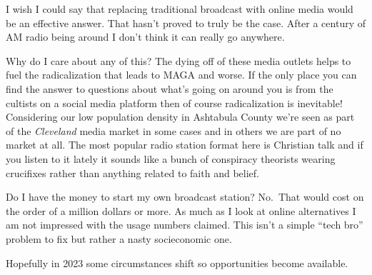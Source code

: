 I wish I could say that replacing traditional broadcast with online
media would be an effective answer. That hasn't proved to truly be the
case. After a century of AM radio being around I don't think it can
really go anywhere.

Why do I care about any of this? The dying off of these media outlets
helps to fuel the radicalization that leads to MAGA and worse. If the
only place you can find the answer to questions about what's going on
around you is from the cultists on a social media platform then of
course radicalization is inevitable! Considering our low population
density in Ashtabula County we're seen as part of the \emph{Cleveland}
media market in some cases and in others we are part of no market at
all. The most popular radio station format here is Christian talk and if
you listen to it lately it sounds like a bunch of conspiracy theorists
wearing crucifixes rather than anything related to faith and belief.

Do I have the money to start my own broadcast station? No.~That would
cost on the order of a million dollars or more. As much as I look at
online alternatives I am not impressed with the usage numbers claimed.
This isn't a simple ``tech bro'' problem to fix but rather a nasty
socieconomic one.

Hopefully in 2023 some circumstances shift so opportunities become
available.
